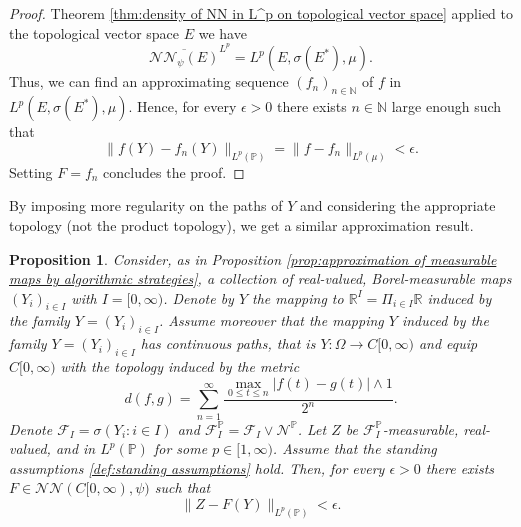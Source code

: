 \documentclass[11pt,a4paper,twoside,openany]{report}
\numberwithin{equation}{section}
\theoremstyle{plain} %
\newtheorem{proposition}[theorem]{Proposition}
\theoremstyle{definition} %
\theoremstyle{remark} %
\begin{document}
\begin{proof}
    Theorem \ref{thm:density of NN in L^p on topological vector space} applied to the topological vector space \(E\) we have 
    \begin{equation*}
        \overline{\mathcal{NN}_{\psi}(E)}^{L^p}=L^p(E,\sigma(E^*),\mu).
    \end{equation*}
Thus, we can find an approximating sequence \((f_n)_{n\in\mathbb{N}}\) of \(f\) in \(L^p(E,\sigma(E^*),\mu)\). Hence, for every \(\epsilon>0\) there exists \(n\in\mathbb{N}\) large enough such that 
    \begin{equation*}
        \lVert f(Y)-f_n(Y)\rVert_{L^p(\mathbb{P})}=\lVert f-f_n\rVert_{L^p(\mu)}<\epsilon.
    \end{equation*}
    Setting \(F=f_n\) concludes the proof.
\end{proof}
By imposing more regularity on the paths of \(Y\) and considering the appropriate topology (not the product topology), we get a similar approximation result.
\begin{proposition}\label{prop:reduction to countably generated sigma algebra is not fundamental in the case of E = C}
 Consider, as in Proposition \ref{prop:approximation of measurable maps by algorithmic strategies}, a collection of real-valued, Borel-measurable maps \((Y_{i})_{i\in I}\) with \(I=[0,\infty)\). Denote by \(Y\) the mapping to \(\mathbb{R}^I=\Pi_{i\in I}\mathbb{R}\) induced by the family \(Y=(Y_i)_{i\in I}\). Assume moreover that the mapping \(Y\) induced by the family \(Y=(Y_i)_{i\in I}\) has continuous paths, that is \(Y:\Omega\to C[0,\infty)\) and equip \(C[0,\infty)\) with the topology induced by the metric
    \begin{equation}\label{eq:locally uniform metric for continuous functions}
    d(f,g)=\sum_{n=1}^\infty\frac{\max_{0\leq t\leq n}|f(t)-g(t)|\wedge 1}{2^n}.
\end{equation}
Denote \(\mathcal{F}_I=\sigma(Y_i:i\in I)\) and \(\mathcal{F}_I^{\mathbb{P}}=\mathcal{F}_I\vee\mathcal{N}^{\mathbb{P}}\).
 Let \(Z\) be \(\mathcal{F}_I^{\mathbb{P}}\)-measurable, real-valued, and in \(L^p(\mathbb{P})\) for some \(p\in[1,\infty)\).  Assume that the standing assumptions \ref{def:standing assumptions} hold. Then, for every \(\epsilon>0\) there exists \(F\in\mathcal{NN}(C[0,\infty),\psi)\) such that 
    \begin{equation*}
        \lVert Z-F(Y)\rVert_{L^p(\mathbb{P})}<\epsilon.
    \end{equation*}
\end{proposition}
\end{document}
